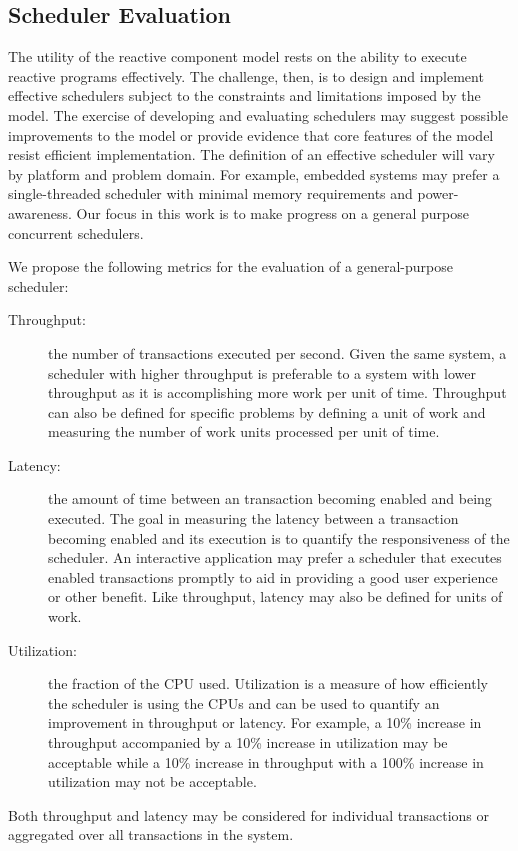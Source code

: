 \subsection{Scheduler Evaluation}

The utility of the reactive component model rests on the ability to execute reactive programs effectively.
The challenge, then, is to design and implement effective schedulers subject to the constraints and limitations imposed by the model.
The exercise of developing and evaluating schedulers may suggest possible improvements to the model or provide evidence that core features of the model resist efficient implementation.
The definition of an effective scheduler will vary by platform and problem domain.
For example, embedded systems may prefer a single-threaded scheduler with minimal memory requirements and power-awareness.
Our focus in this work is to make progress on a general purpose concurrent schedulers.

We propose the following metrics for the evaluation of a general-purpose scheduler:
\begin{description}
\item[Throughput:] the number of transactions executed per second.
Given the same system, a scheduler with higher throughput is preferable to a system with lower throughput as it is accomplishing more work per unit of time.
Throughput can also be defined for specific problems by defining a unit of work and measuring the number of work units processed per unit of time.
\item[Latency:] the amount of time between an transaction becoming enabled and being executed.
The goal in measuring the latency between a transaction becoming enabled and its execution is to quantify the responsiveness of the scheduler.
An interactive application may prefer a scheduler that executes enabled transactions promptly to aid in providing a good user experience or other benefit.
Like throughput, latency may also be defined for units of work.
\item[Utilization:] the fraction of the CPU used.
Utilization is a measure of how efficiently the scheduler is using the CPUs and can be used to quantify an improvement in throughput or latency.
For example, a 10\% increase in throughput accompanied by a 10\% increase in utilization may be acceptable while a 10\% increase in throughput with a 100\% increase in utilization may not be acceptable.
\end{description}
Both throughput and latency may be considered for individual transactions or aggregated over all transactions in the system.

